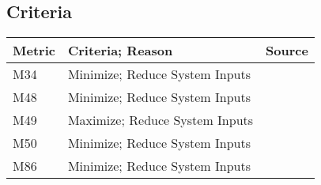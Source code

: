 \documentclass{report}
\begin{document}
\subsection{Criteria}
\begin{center}
    \begin{tabular}{|l|p{12.6cm}|p{1.3cm}|}
        \hline
        \textbf{Metric} & \textbf{Criteria; Reason} & \textbf{Source} \\
        \hline
        M34 & Minimize; Reduce System Inputs & \cite{applicantguide} \\
        \hline
        M48 & Minimize; Reduce System Inputs & \cite{applicantguide} \\
        \hline
        M49 & Maximize; Reduce System Inputs & \cite{applicantguide} \\
        \hline
        M50 & Minimize; Reduce System Inputs & \cite{applicantguide} \\
        \hline
        M86 & Minimize; Reduce System Inputs & \cite{applicantguide} \\
        \hline
    \end{tabular}
\end{center}

\newpage




\end{document}
